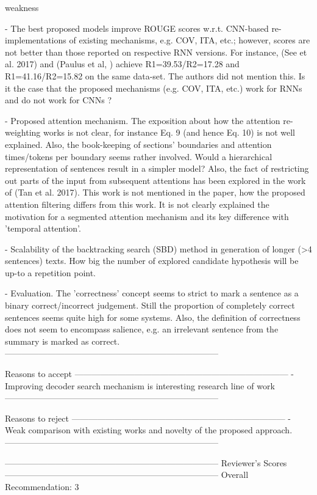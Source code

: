 weakness

- The best proposed models improve ROUGE scores w.r.t. CNN-based re-implementations of existing mechanisms, e.g. COV, ITA, etc.; however, scores are not better than those reported on respective RNN versions. For instance, (See et al. 2017) and (Paulus et al, ) achieve R1=39.53/R2=17.28  and R1=41.16/R2=15.82 on the same data-set. The authors did not mention this. Is it the case that the proposed mechanisms (e.g. COV, ITA, etc.) work for RNNs and do not work for CNNs ?

- Proposed attention mechanism. The exposition about how the attention re-weighting works is not clear, for instance Eq. 9 (and hence Eq. 10) is not well explained. Also, the book-keeping of sections' boundaries and attention times/tokens per boundary seems rather involved. Would a hierarchical representation of sentences result in a simpler model? Also, the fact of restricting out parts of the input from subsequent attentions has been explored in the work of (Tan et al. 2017). This work is not mentioned in the paper, how the proposed attention filtering differs from this work. It is not clearly explained the motivation for a segmented attention mechanism and its key difference with 'temporal attention'.

- Scalability of the backtracking search (SBD) method in generation of longer (>4 sentences) texts. How big the number of explored candidate hypothesis will be up-to a repetition point.

- Evaluation. The 'correctness' concept seems to strict to mark a sentence as a binary correct/incorrect judgement. Still the proportion of completely correct sentences seems quite high for some systems. Also, the definition of correctness does not seem to encompass salience, e.g. an irrelevant sentence from the summary is marked as correct.
---------------------------------------------------------------------------


Reasons to accept
---------------------------------------------------------------------------
- Improving decoder search mechanism is interesting research line of work
---------------------------------------------------------------------------


Reasons to reject
---------------------------------------------------------------------------
- Weak comparison with existing works and novelty of the proposed approach.
---------------------------------------------------------------------------


---------------------------------------------------------------------------
Reviewer's Scores
---------------------------------------------------------------------------
                  Overall Recommendation: 3

